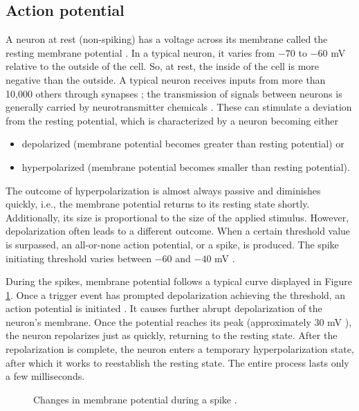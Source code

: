 \subsection{Action potential}
\label{sec:action-potential}

A neuron at rest (non-spiking) has a voltage across its membrane called the resting membrane potential \cite{KandelBook2003:6}. In a typical neuron, it varies from $-70$ to $-60$ mV relative to the outside of the cell. So, at rest, the inside of the cell is more negative than the outside. A typical neuron receives inputs from more than 10,000 others through synapses \cite{IzhikevichBook2004:2}; the transmission of signals between neurons is generally carried by neurotransmitter chemicals \cite{KandelBook2003:6}. These can stimulate a deviation from the resting potential, which is characterized by a neuron becoming either
\begin{itemize}
    \item depolarized (membrane potential becomes greater than resting potential) or
    
    \item hyperpolarized (membrane potential becomes smaller than resting potential).
\end{itemize}

The outcome of hyperpolarization is almost always passive and diminishes quickly, i.e., the membrane potential returns to its resting state shortly. Additionally, its size is proportional to the size of the applied stimulus. However, depolarization often leads to a different outcome. When a certain threshold value is surpassed, an all-or-none action potential, or a spike, is produced. The spike initiating threshold varies between $-60$ and $-40$ mV \cite{Platkiewicz2010}. 

During the spikes, membrane potential follows a typical curve displayed in Figure \ref{fig:action-potential}. Once a trigger event has prompted depolarization achieving the threshold, an action potential is initiated \cite{KandelBook2003:7}. It causes further abrupt depolarization of the neuron's membrane. Once the potential reaches its peak (approximately $30$ mV \cite{Izhikevich2003}), the neuron repolarizes just as quickly, returning to the resting state. After the repolarization is complete, the neuron enters a temporary hyperpolarization state, after which it works to reestablish the resting state. The entire process lasts only a few milliseconds.

\begin{figure}
    \centering
    
    \caption{Changes in membrane potential during a spike \cite{ClarkBook2018:35.2}.}
    \label{fig:action-potential}
\end{figure}
